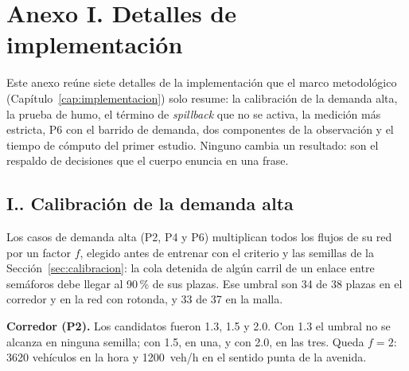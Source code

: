 \section*{Anexo I. Detalles de implementación}
{}
\setcounter{table}{0}
\renewcommand{\thetable}{I.\arabic{table}}
\renewcommand{\theHtable}{I.\arabic{table}}
\setcounter{figure}{0}
\renewcommand{\thefigure}{I.\arabic{figure}}
\renewcommand{\theHfigure}{I.\arabic{figure}}
\setcounter{equation}{0}
\renewcommand{\theequation}{I.\arabic{equation}}
\renewcommand{\theHequation}{I.\arabic{equation}}
\renewcommand{\theanexoIapartado}{I.\arabic{anexoIapartado}}

Este anexo reúne siete detalles de la implementación que el marco
metodológico (Capítulo~\ref{cap:implementacion}) solo resume: la
calibración de la demanda alta, la prueba de humo, el término de
\textit{spillback} que no se activa, la medición más estricta, P6 con
el barrido de demanda, dos componentes de la observación y el tiempo de
cómputo del primer estudio. Ninguno cambia un resultado: son el
respaldo de decisiones que el cuerpo enuncia en una frase.

\subsection*{\theanexoIapartado. Calibración de la demanda alta}

Los casos de demanda alta (P2, P4 y P6) multiplican todos los flujos de
su red por un factor $f$, elegido antes de entrenar con el criterio y
las semillas de la Sección~\ref{sec:calibracion}: la cola detenida de
algún carril de un enlace entre semáforos debe llegar al 90\,\% de sus
plazas. Ese umbral son 34 de 38 plazas en el corredor y en la red con
rotonda, y 33 de 37 en la malla.

\noindent\textbf{Corredor (P2).} Los candidatos fueron 1.3, 1.5 y 2.0.
Con 1.3 el umbral no se alcanza en ninguna semilla; con 1.5, en una, y
con 2.0, en las tres. Queda $f = 2$: 3620 vehículos en la hora y
1200~veh/h en el sentido punta de la avenida.

